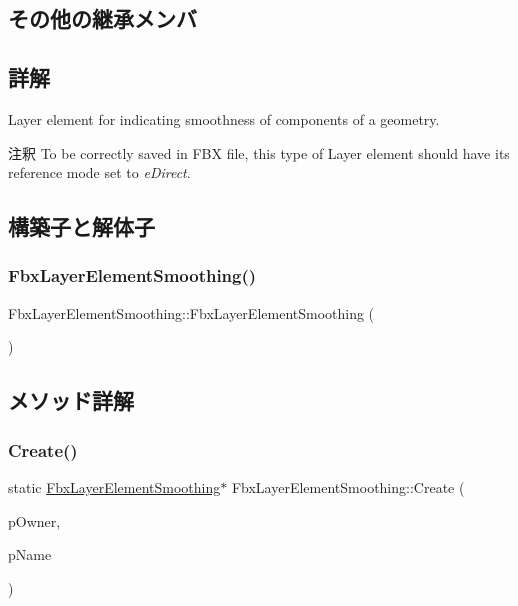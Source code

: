 \subsection*{その他の継承メンバ}


\subsection{詳解}
Layer element for indicating smoothness of components of a geometry. \begin{DoxyRemark}{注釈}
To be correctly saved in F\+BX file, this type of Layer element should have its reference mode set to {\itshape e\+Direct}. 
\end{DoxyRemark}


\subsection{構築子と解体子}
\mbox{\label{class_fbx_layer_element_smoothing_a3821d7b7a1de97865516aa3937290d82}} 
\subsubsection{\texorpdfstring{Fbx\+Layer\+Element\+Smoothing()}{FbxLayerElementSmoothing()}}
{\footnotesize\ttfamily Fbx\+Layer\+Element\+Smoothing\+::\+Fbx\+Layer\+Element\+Smoothing (\begin{DoxyParamCaption}{ }\end{DoxyParamCaption})\hspace{0.3cm}{\ttfamily [protected]}}



\subsection{メソッド詳解}
\mbox{\label{class_fbx_layer_element_smoothing_afdb42053590ce288c60e5539a0b2d875}} 
\subsubsection{\texorpdfstring{Create()}{Create()}}
{\footnotesize\ttfamily static \hyperlink{class_fbx_layer_element_smoothing}{Fbx\+Layer\+Element\+Smoothing}$\ast$ Fbx\+Layer\+Element\+Smoothing\+::\+Create (\begin{DoxyParamCaption}\item[{\hyperlink{class_fbx_layer_container}{Fbx\+Layer\+Container} $\ast$}]{p\+Owner,  }\item[{const char $\ast$}]{p\+Name }\end{DoxyParamCaption})\hspace{0.3cm}{\ttfamily [static]}}

